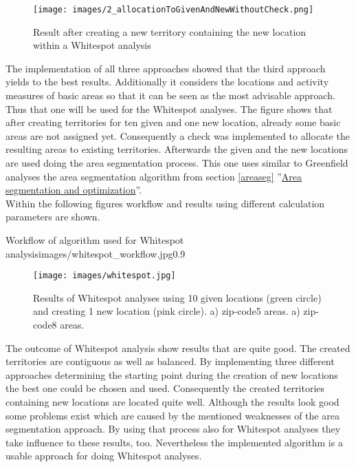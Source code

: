 \begin{figure}[H]
	\centering
	\texttt{[image: images/2\_allocationToGivenAndNewWithoutCheck.png]}
	\caption{Result after creating a new territory containing the new location within a Whitespot analysis}
\end{figure}

The implementation of all three approaches showed that the third approach yields to the best results. Additionally it considers the locations and activity measures of basic areas so that it can be seen as the most advisable approach. Thus that one will be used for the Whitespot analyses. The figure shows that after creating territories for ten given and one new location, already some basic areas are not assigned yet. Consequently a check was implemented to allocate the resulting areas to existing territories. Afterwards the given and the new locations are used doing the area segmentation process. This one uses similar to Greenfield analyses the area segmentation algorithm from section \ref{areaseg} ''\hyperref[areaseg]{Area segmentation and optimization}''.\\
Within the following figures workflow and results using different calculation parameters are shown.

\begin{figurevarSize}{Workflow of algorithm used for Whitespot analysis}{images/whitespot_workflow.jpg}{0.9}\end{figurevarSize}

\begin{figure}[H]
	\centering
	\texttt{[image: images/whitespot.jpg]}
	\caption[Results of Whitespot analyses using 10 given locations (green circle) and creating 1 new location (pink circle).]{Results of Whitespot analyses using 10 given locations (green circle) and creating 1 new location (pink circle). a) zip-code5 areas. a) zip-code8 areas.}
\end{figure}

The outcome of Whitespot analysis show results that are quite good. The created territories are contiguous as well as balanced. By implementing three different approaches determining the starting point during the creation of new locations the best one could be chosen and used. Consequently the created territories containing new locations are located quite well. Although the results look good some problems exist which are caused by the mentioned weaknesses of the area segmentation approach. By using that process also for Whitespot analyses they take influence to these results, too. Nevertheless the implemented algorithm is a usable approach for doing Whitespot analyses.